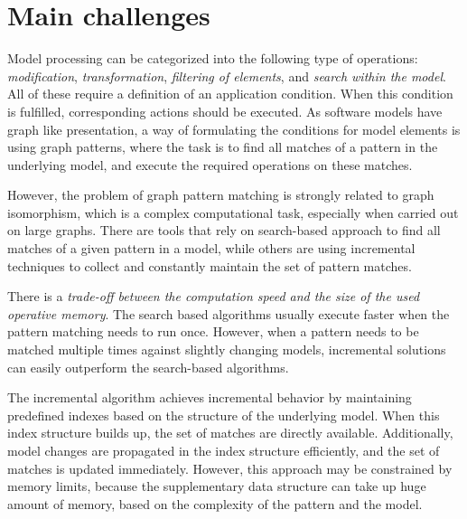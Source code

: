 \section{Main challenges}

Model processing can be categorized into the following type of operations: \emph{modification}, \emph{transformation}, \emph{filtering of elements}, and \emph{search within the model}. All of these require a definition of an application condition. When this condition is fulfilled, corresponding actions should be executed. As software models have graph like presentation, a way of formulating the conditions for model elements is using graph patterns,
where the task is to find all matches of a pattern in the underlying model, and execute the required operations on these matches.



However, the problem of graph pattern matching is strongly related to graph isomorphism, which is a complex computational task, especially when carried out on large graphs. There are tools that rely on search-based approach to find all matches of a given pattern in a model, while others are using incremental techniques to collect and constantly maintain the set of pattern matches.

There is a \emph{trade-off between the computation speed and the size of the used operative memory}. The search based algorithms usually execute faster when the pattern matching needs to run once. However, when a pattern needs to be matched multiple times against slightly changing models, incremental solutions can easily outperform the search-based algorithms. 

The incremental algorithm achieves incremental behavior by maintaining predefined indexes based on the structure of the underlying model. When this index structure builds up, the set of matches are directly available. Additionally, model changes are propagated in the index structure efficiently, and the set of matches is updated immediately. However, this approach may be constrained by memory limits, because the supplementary data structure can take up huge amount of memory, based on the complexity of the pattern and the model.


